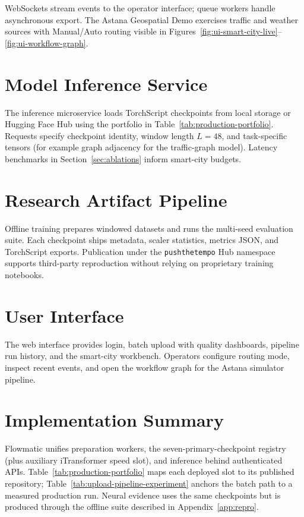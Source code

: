 WebSockets stream events to the operator interface; queue workers handle asynchronous export. The Astana Geospatial Demo exercises traffic and weather sources with Manual/Auto routing visible in Figures~\ref{fig:ui-smart-city-live}--\ref{fig:ui-workflow-graph}.

\section{Model Inference Service}

The inference microservice loads TorchScript checkpoints from local storage or Hugging Face Hub using the portfolio in Table~\ref{tab:production-portfolio}. Requests specify checkpoint identity, window length $L{=}48$, and task-specific tensors (for example graph adjacency for the traffic-graph model). Latency benchmarks in Section~\ref{sec:ablations} inform smart-city budgets.

\section{Research Artifact Pipeline}

Offline training prepares windowed datasets and runs the multi-seed evaluation suite. Each checkpoint ships metadata, scaler statistics, metrics JSON, and TorchScript exports. Publication under the \texttt{pushthetempo} Hub namespace supports third-party reproduction without relying on proprietary training notebooks.

\section{User Interface}

The web interface provides login, batch upload with quality dashboards, pipeline run history, and the smart-city workbench. Operators configure routing mode, inspect recent events, and open the workflow graph for the Astana simulator pipeline.



\section{Implementation Summary}

Flowmatic unifies preparation workers, the seven-primary-checkpoint registry (plus auxiliary iTransformer speed slot), and inference behind authenticated APIs. Table~\ref{tab:production-portfolio} maps each deployed slot to its published repository; Table~\ref{tab:upload-pipeline-experiment} anchors the batch path to a measured production run. Neural evidence uses the same checkpoints but is produced through the offline suite described in Appendix~\ref{app:repro}.


